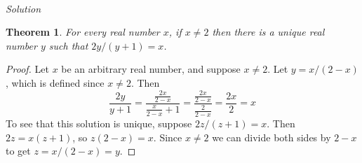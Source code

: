 \documentclass{report}
\newtheorem*{theorem}{Theorem}
\theoremstyle{definition}
\begin{document}
\vspace{1mm}\\
\textit{Solution}
\begin{theorem}
For every real number $x$, if $x\neq2$ then there is a unique real number $y$ such that $2y/(y+1)=x$.
\end{theorem}
\begin{proof}
Let $x$ be an arbitrary real number, and suppose $x\neq 2$. Let $y=x/(2-x)$, which is defined since $x\neq2$. Then
\begin{equation*}
\frac{2y}{y+1}=\frac{\frac{2x}{2-x}}{\frac{x}{2-x}+1}=\frac{\frac{2x}{2-x}}{\frac{2}{2-x}}=\frac{2x}{2}=x
\end{equation*}
To see that this solution is unique, suppose $2z/(z+1)=x$. Then $2z=x(z+1)$, so $z(2-x)=x$. Since $x\neq2$ we can divide both sides by $2-x$ to get $z=x/(2-x)=y$.
\end{proof}
\newpage
\end{document}
